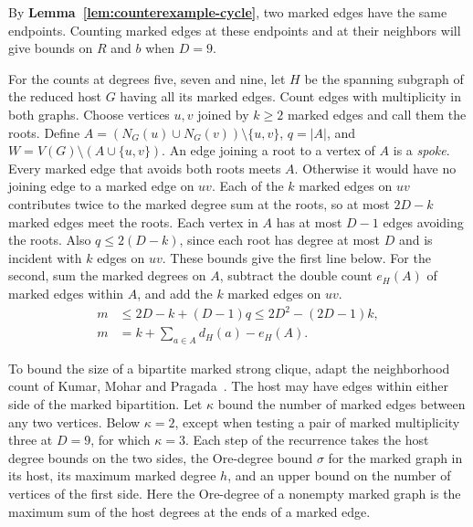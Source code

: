 \documentclass[preprint,11pt,numbers]{elsarticle-arxiv}
\numberwithin{equation}{section}
\theoremstyle{definition}
\begin{document}
By \textbf{Lemma~\ref{lem:counterexample-cycle}}, two marked
edges have the same endpoints. Counting marked edges at these
endpoints and at their neighbors will give bounds on $R$ and
$b$ when $D=9$.

For the counts at degrees five, seven and nine, let $H$ be the
spanning subgraph of the reduced host $G$ having all its marked
edges. Count edges with multiplicity in both graphs. Choose
vertices $u,v$ joined by $k\geq2$ marked edges and call them the
roots. Define $A=(N_G(u)\cup N_G(v))\setminus\{u,v\}$, $q=|A|$,
and $W=V(G)\setminus(A\cup\{u,v\})$. An edge joining a root
to a vertex of $A$ is a \emph{spoke}. Every marked edge that
avoids both roots meets $A$. Otherwise it would have no joining
edge to a marked edge on $uv$. Each of the $k$ marked edges
on $uv$ contributes twice to the marked degree sum at the
roots, so at most $2D-k$ marked edges meet the roots. Each
vertex in $A$ has at most $D-1$ edges avoiding the roots.
Also $q\le2(D-k)$, since each root has degree at most $D$ and
is incident with $k$ edges on $uv$. These bounds give the first
line below. For the second, sum the marked degrees on $A$,
subtract the double count $e_H(A)$ of marked edges within $A$,
and add the $k$ marked edges on $uv$.
\begin{equation}\label{eq:multi-root-pair-budget}
\begin{aligned}
 m&\le 2D-k+(D-1)q\le 2D^2-(2D-1)k,\\
 m&=k+\sum_{a\in A}d_H(a)-e_H(A).
\end{aligned}
\end{equation}

To bound the size of a bipartite marked strong clique, adapt the
neighborhood count of Kumar, Mohar and Pragada~\cite{KumarMoharPragada2026}.
The host may have edges within either side of the marked
bipartition. Let $\kappa$ bound the number of marked edges
between any two vertices. Below $\kappa=2$, except when
testing a pair of marked multiplicity three at $D=9$, for
which $\kappa=3$. Each step of the recurrence takes the host
degree bounds on the two sides, the Ore-degree bound $\sigma$
for the marked graph in its host, its maximum marked degree
$h$, and an upper bound on the number of vertices of the first
side. Here the Ore-degree of a nonempty marked graph is the
maximum sum of the host degrees at the ends of a marked edge.
\end{document}
